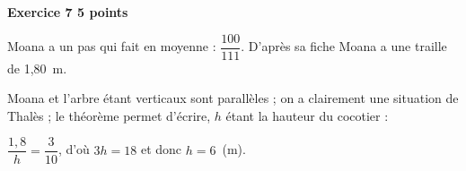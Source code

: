 \textbf{Exercice 7 \hfill 5 points}

\medskip

%
% 
%
% 
% 
% 
Moana a un pas qui fait en moyenne : $\dfrac{100}{111}$. D’après sa fiche Moana a une traille de 1,80~m.

Moana et l’arbre étant verticaux sont parallèles ; on a clairement une situation de Thalès  ; le théorème permet d’écrire, $h$ étant la hauteur du cocotier :

$\dfrac{1,8}{h} = \dfrac{3}{10}$, d’où $3h = 18$ et donc $h = 6$~(m).
\bigskip

